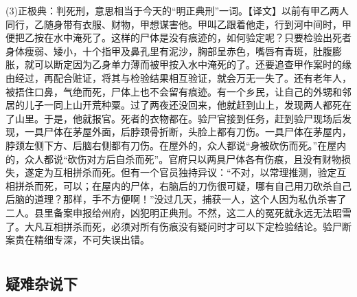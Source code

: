 \documentclass[12pt,UTF8]{ctexbook}
\begin{document}
(3)正极典：判死刑，意思相当于今天的“明正典刑”一词。【译文】以前有甲乙两人同行，乙随身带有衣服、财物，甲想谋害他。甲叫乙跟着他走，行到河中间时，甲便把乙按在水中淹死了。这样的尸体是没有痕迹的，如何验定呢？只要检验出死者身体瘦弱、矮小，十个指甲及鼻孔里有泥沙，胸部呈赤色，嘴唇有青斑，肚腹膨胀，就可以断定因为乙身单力薄而被甲按入水中淹死的了。还要追查甲作案时的缘由经过，再配合赃证，将其与检验结果相互验证，就会万无一失了。还有老年人，被捂住口鼻，气绝而死，尸体上也不会留有痕迹。有一个乡民，让自己的外甥和邻居的儿子一同上山开荒种粟。过了两夜还没回来，他就赶到山上，发现两人都死在了山里。于是，他就报官。死者的衣物都在。验尸官接到任务，赶到验尸现场后发现，一具尸体在茅屋外面，后脖颈骨折断，头脸上都有刀伤。一具尸体在茅屋内，脖颈左侧下方、后脑右侧都有刀伤。在屋外的，众人都说“身被砍伤而死。”在屋内的，众人都说“砍伤对方后自杀而死”。官府只以两具尸体各有伤痕，且没有财物损失，遂定为互相拼杀而死。但有一个官员独持异议：“不对，以常理推测，验定互相拼杀而死，可以；在屋内的尸体，右脑后的刀伤很可疑，哪有自己用刀砍杀自己后脑的道理？那样，手不方便啊！”没过几天，捕获一人，这个人因为私仇杀害了二人。县里备案申报给州府，凶犯明正典刑。不然，这二人的冤死就永远无法昭雪了。大凡互相拼杀而死，必须对所有伤痕没有疑问时才可以下定检验结论。验尸断案贵在精细专深，不可失误出错。　

\part{}

\chapter{疑难杂说下}
\end{document}
